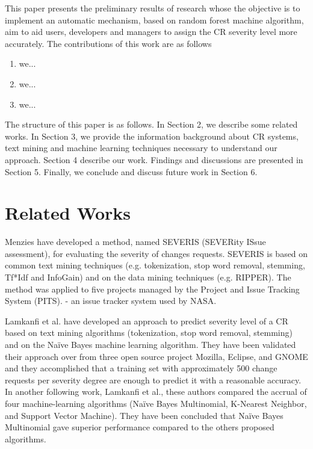 \documentclass[10pt, conference]{IEEEtran}
\begin{document}
This paper presents the preliminary results of research whose the objective is to implement an automatic mechanism, based on random forest machine algorithm, aim to aid users, developers and managers to assign the CR severity level more accurately. 
The contributions of this work are as follows

\begin{enumerate}
  \item we...
  \item we...
  \item we...
  
\end{enumerate}

The structure of this paper is as follows. In Section 2, we describe some related works. In Section 3, we provide the information background about CR systems, text mining and machine learning techniques necessary to understand our approach. Section 4 describe our work. Findings and discussions are presented in Section 5. Finally, we conclude and discuss future work in Section 6.


\section{Related Works}

Menzies\cite{Menzies2008} have developed a method, named SEVERIS (SEVERity ISsue assessment), for evaluating the severity of changes requests. SEVERIS is based on common text mining techniques (e.g. tokenization, stop word removal, stemming, Tf*Idf and InfoGain) and on the data mining techniques (e.g. RIPPER). The method was applied to five projects managed by the Project and Issue Tracking System (PITS). - an issue tracker system used by NASA.

Lamkanfi et al.\cite{Lamkanfi2010} have developed an approach to predict severity level of a CR based on text mining algorithms (tokenization, stop word removal, stemming) and on the Naïve Bayes machine learning algorithm. They have been validated their approach over from three open source project Mozilla, Eclipse, and GNOME and they accomplished that a training set with approximately 500 change requests per severity degree are enough to predict it with a reasonable accuracy. In another following work, Lamkanfi et al.\cite{Lamkanfi2011}, these authors compared the accrual of four machine-learning algorithms (Naïve Bayes Multinomial, K-Nearest Neighbor, and Support Vector Machine). They have been concluded that Naïve Bayes Multinomial gave superior performance compared to the others proposed algorithms.
\end{document}

